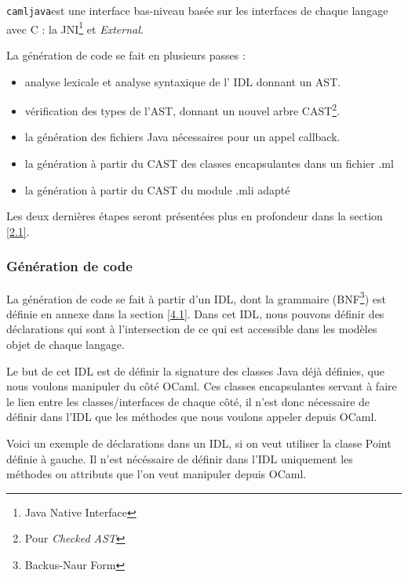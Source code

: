 \documentclass[a4paper, 11pt]{article}
\newcommand{\camljava}{{\tt{camljava}}}
\begin{document}
\camljava est une interface bas-niveau basée sur les interfaces de chaque langage avec C : la JNI\footnote{Java Native Interface} et \emph{External}.

La génération de code se fait en plusieurs passes :
\begin{itemize}
\item analyse lexicale et analyse syntaxique de l' IDL donnant un AST.
\item vérification des types de l'AST, donnant un nouvel arbre CAST\footnote{Pour \emph{Checked AST}}.
\item la génération des fichiers Java nécessaires pour un appel callback. 
\item la génération à partir du CAST des classes encapsulantes dans un fichier .ml
\item la génération à partir du CAST du module .mli adapté
\end{itemize}
Les deux dernières étapes seront présentées plus en profondeur dans la
section \ref{2.1}.




\subsubsection{Génération de code}
La génération de code se fait à partir d'un IDL, dont la grammaire
(BNF\footnote{Backus-Naur Form}) est définie en annexe dans la section \ref{4.1}.
Dans cet IDL, nous pouvons définir des déclarations qui sont à
l'intersection de ce qui est accessible dans les modèles objet de
chaque langage. 

Le but de cet IDL est de définir la signature des
classes Java déjà définies, que nous voulons manipuler du côté OCaml.
Ces classes encapsulantes servant à faire le lien entre les
classes/interfaces de chaque côté, il n'est donc nécessaire de définir
dans l'IDL que les méthodes que nous voulons appeler depuis OCaml.

Voici un exemple de déclarations dans un IDL, si on veut utiliser la classe Point définie à gauche. Il n'est nécéssaire de définir dans l'IDL uniquement les méthodes ou attributs que l'on veut manipuler depuis OCaml.

\newpage
\end{document}

